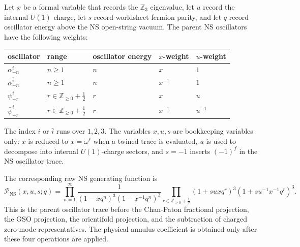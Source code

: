 \documentclass[11pt]{article}
\newcommand{\Z}{\mathbb{Z}}
\newcommand{\NS}{\mathrm{NS}}
\begin{document}
Let \(x\) be a formal variable that records the \(\Z_3\) eigenvalue, let \(u\) record the
internal \(U(1)\) charge, let \(s\) record worldsheet fermion parity, and let \(q\) record
oscillator energy above the NS open-string vacuum. The parent NS oscillators have the following
weights:
\begin{center}
\begin{tabular}{@{}lllll@{}}
\toprule
oscillator & range & oscillator energy & \(x\)-weight & \(u\)-weight \\
\midrule
\(\alpha^i_{-n}\) & \(n\ge 1\) & \(n\) & \(x\) & \(1\) \\
\(\bar\alpha^{\bar i}_{-n}\) & \(n\ge 1\) & \(n\) & \(x^{-1}\) & \(1\) \\
\(\psi^i_{-r}\) & \(r\in \Z_{\ge0}+\frac12\) & \(r\) & \(x\) & \(u\) \\
\(\bar\psi^{\bar i}_{-r}\) & \(r\in \Z_{\ge0}+\frac12\) & \(r\) & \(x^{-1}\) & \(u^{-1}\) \\
\bottomrule
\end{tabular}
\end{center}
The index \(i\) or \(\bar i\) runs over \(1,2,3\). The variables \(x,u,s\) are bookkeeping
variables only: \(x\) is reduced to \(x=\omega^\ell\) when a twined trace is evaluated, \(u\)
is used to decompose into internal \(U(1)\)-charge sectors, and \(s=-1\) inserts
\((-1)^f\) in the NS oscillator trace.

The corresponding raw NS generating function is
\begin{equation}
  \mathcal P_{\NS}(x,u,s;q)
  =
  \prod_{n=1}^{\infty}
  \frac{1}
  {(1-xq^n)^3(1-x^{-1}q^n)^3}
  \prod_{r\in\Z_{\ge0}+\frac12}
  (1+suxq^r)^3(1+su^{-1}x^{-1}q^r)^3 .
  \label{eq:parent-NS-oscillator-generating-function}
\end{equation}
This is the parent oscillator trace before the Chan-Paton fractional projection, the GSO
projection, the orientifold projection, and the subtraction of charged zero-mode
representatives. The physical annulus coefficient is obtained only after these four operations
are applied.
\end{document}
